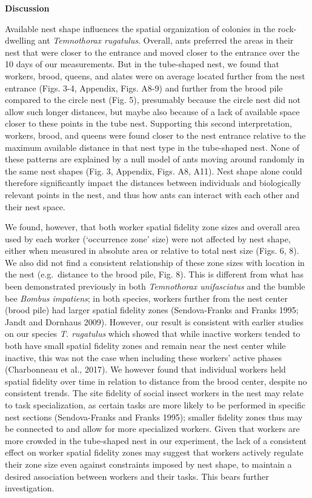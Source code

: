 \documentclass[3p]{elsarticle} %
\begin{document}
\textbf{Discussion}

Available nest shape influences the spatial organization of colonies in
the rock-dwelling ant \emph{Temnothorax rugatulus}. Overall, ants
preferred the areas in their nest that were closer to the entrance and
moved closer to the entrance over the 10 days of our measurements. But
in the tube-shaped nest, we found that workers, brood, queens, and
alates were on average located further from the nest entrance (Figs.
3-4, Appendix, Figs. A8-9) and further from the brood pile compared to
the circle nest (Fig. 5), presumably because the circle nest did not
allow such longer distances, but maybe also because of a lack of
available space closer to these points in the tube nest. Supporting this
second interpretation, workers, brood, and queens were found closer to
the nest entrance relative to the maximum available distance in that
nest type in the tube-shaped nest. None of these patterns are explained
by a null model of ants moving around randomly in the same nest shapes
(Fig. 3, Appendix, Figs. A8, A11). Nest shape alone could therefore
significantly impact the distances between individuals and biologically
relevant points in the nest, and thus how ants can interact with each
other and their nest space.

We found, however, that both worker spatial fidelity zone sizes and
overall area used by each worker (`occurrence zone' size) were not
affected by nest shape, either when measured in absolute area or
relative to total nest size (Figs. 6, 8). We also did not find a
consistent relationship of these zone sizes with location in the nest
(e.g.~distance to the brood pile, Fig. 8). This is different from what
has been demonstrated previously in both \emph{Temnothorax unifasciatus}
and the bumble bee \emph{Bombus impatiens}; in both species, workers
further from the nest center (brood pile) had larger spatial fidelity
zones (Sendova-Franks and Franks 1995; Jandt and Dornhaus 2009).
However, our result is consistent with earlier studies on our species
\emph{T. rugatulus} which showed that while inactive workers tended to
both have small spatial fidelity zones and remain near the nest center
while inactive, this was not the case when including these workers'
active phases (Charbonneau et al., 2017). We however found that
individual workers held spatial fidelity over time in relation to
distance from the brood center, despite no consistent trends. The site
fidelity of social insect workers in the nest may relate to task
specialization, as certain tasks are more likely to be performed in
specific nest sections (Sendova-Franks and Franks 1995); smaller
fidelity zones thus may be connected to and allow for more specialized
workers. Given that workers are more crowded in the tube-shaped nest in
our experiment, the lack of a consistent effect on worker spatial
fidelity zones may suggest that workers actively regulate their zone
size even against constraints imposed by nest shape, to maintain a
desired association between workers and their tasks. This bears further
investigation.
\end{document}
